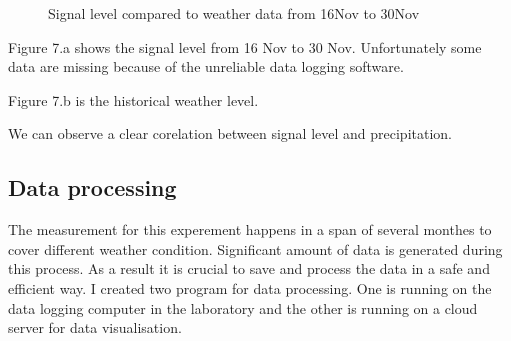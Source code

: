 \begin{figure}[h!]
    \centering
     \quad
     \quad
 
    \caption{Signal level compared to weather data from 16Nov to 30Nov}
    \label{fig:signal and weather}
  \end{figure}

  Figure 7.a shows the signal level from 16 Nov to 30 Nov. Unfortunately some data are missing because of
  the unreliable data logging software.
  
  Figure 7.b is the historical weather level. \cite{weather}

  We can observe a clear corelation between signal level and precipitation.


\newpage
\subsection{Data processing}
The measurement for this experement happens in a span of several monthes to cover different 
weather condition. Significant amount of data is generated during this process. As a result it is
crucial to save and process the data in a safe and efficient way. I created two program for data processing.
One is running on the data logging computer in the laboratory and the other is running on a cloud server for
data visualisation.

